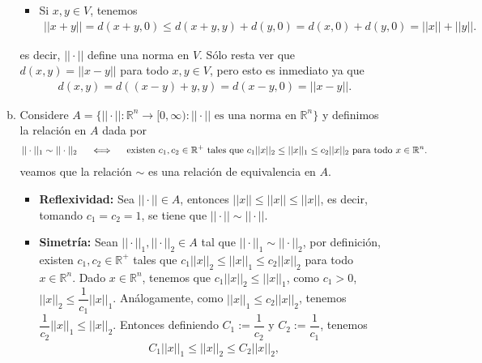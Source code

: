 \begin{itemize}[leftmargin=*]
\begin{solution}
\begin{enumerate}[(a)]
\begin{itemize}
                    \item Si $x,y \in V$, tenemos
                    \begin{align*}
                        ||x+y||=d(x+y,0)\leq d(x+y,y)+d(y,0)=d(x,0)+d(y,0)=||x||+||y||.
                    \end{align*}
                \end{itemize}
                es decir, $||\cdot||$ define una norma en $V$. Sólo resta ver que $d(x,y)=||x-y||$ para todo $x,y \in V$, pero esto es inmediato ya que
                \begin{align*}
                    d(x,y)=d((x-y)+y,y)=d(x-y,0)=||x-y||.
                \end{align*}

                \item Considere $A=\{||\cdot||:\mathbb{R}^n\to [0,\infty):||\cdot|| \text{ es una norma en } \mathbb{R}^n\}$ y definimos la relación en $A$ dada por 
                \begin{align*}
                    ||\cdot||_1 \sim ||\cdot||_2 \hspace{5mm} \Longleftrightarrow \hspace{5mm} \text{existen } c_1,c_2\in \mathbb{R}^+ \text{ tales que } c_1||x||_2\leq ||x||_1\leq c_2||x||_2 \text{ para todo } x \in \mathbb{R}^n.
                \end{align*}
                veamos que la relación $\sim$ es una relación de equivalencia en $A$.
                \begin{itemize}
                    \item \textbf{Reflexividad:} Sea $||\cdot||\in A$, entonces $||x||\leq ||x||\leq ||x||$, es decir, tomando $c_1=c_2=1$, se tiene que $||\cdot||\sim ||\cdot||$.
                    \item \textbf{Simetría:} Sean $||\cdot||_1, ||\cdot||_2 \in A$ tal que $||\cdot||_1\sim ||\cdot||_2$, por definición, existen $c_1,c_2 \in \mathbb{R}^+$ tales que $c_1||x||_2\leq ||x||_1\leq c_2||x||_2$ para todo $x \in \mathbb{R}^n$. Dado $x \in \mathbb{R}^n$, tenemos que $c_1||x||_2\leq ||x||_1$, como $c_1>0$, $||x||_2\leq \dfrac{1}{c_1}||x||_1$. Análogamente, como $||x||_1\leq c_2||x||_2$, tenemos $\dfrac{1}{c_2}||x||_1\leq ||x||_2$. Entonces definiendo $C_1:=\dfrac{1}{c_2}$ y $C_2:=\dfrac{1}{c_1}$, tenemos
                    \begin{align*}
                        C_1||x||_1\leq ||x||_2\leq C_2||x||_2,
                    \end{align*}

\end{itemize}
\end{enumerate}
\end{solution}
\end{itemize}
